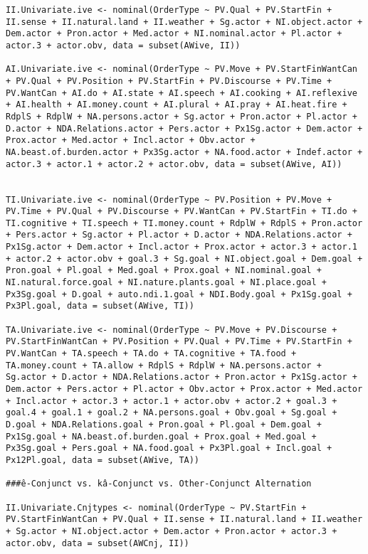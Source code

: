 \begin{lstlisting}[style=mystyle]
II.Univariate.ive <- nominal(OrderType ~ PV.Qual + PV.StartFin + II.sense + II.natural.land + II.weather + Sg.actor + NI.object.actor + Dem.actor + Pron.actor + Med.actor + NI.nominal.actor + Pl.actor + actor.3 + actor.obv, data = subset(AWive, II))

AI.Univariate.ive <- nominal(OrderType ~ PV.Move + PV.StartFinWantCan + PV.Qual + PV.Position + PV.StartFin + PV.Discourse + PV.Time + PV.WantCan + AI.do + AI.state + AI.speech + AI.cooking + AI.reflexive + AI.health + AI.money.count + AI.plural + AI.pray + AI.heat.fire + RdplS + RdplW + NA.persons.actor + Sg.actor + Pron.actor + Pl.actor + D.actor + NDA.Relations.actor + Pers.actor + Px1Sg.actor + Dem.actor + Prox.actor + Med.actor + Incl.actor + Obv.actor + NA.beast.of.burden.actor + Px3Sg.actor + NA.food.actor + Indef.actor + actor.3 + actor.1 + actor.2 + actor.obv, data = subset(AWive, AI))


TI.Univariate.ive <- nominal(OrderType ~ PV.Position + PV.Move + PV.Time + PV.Qual + PV.Discourse + PV.WantCan + PV.StartFin + TI.do + TI.cognitive + TI.speech + TI.money.count + RdplW + RdplS + Pron.actor + Pers.actor + Sg.actor + Pl.actor + D.actor + NDA.Relations.actor + Px1Sg.actor + Dem.actor + Incl.actor + Prox.actor + actor.3 + actor.1 + actor.2 + actor.obv + goal.3 + Sg.goal + NI.object.goal + Dem.goal + Pron.goal + Pl.goal + Med.goal + Prox.goal + NI.nominal.goal + NI.natural.force.goal + NI.nature.plants.goal + NI.place.goal + Px3Sg.goal + D.goal + auto.ndi.1.goal + NDI.Body.goal + Px1Sg.goal + Px3Pl.goal, data = subset(AWive, TI))

TA.Univariate.ive <- nominal(OrderType ~ PV.Move + PV.Discourse + PV.StartFinWantCan + PV.Position + PV.Qual + PV.Time + PV.StartFin + PV.WantCan + TA.speech + TA.do + TA.cognitive + TA.food + TA.money.count + TA.allow + RdplS + RdplW + NA.persons.actor + Sg.actor + D.actor + NDA.Relations.actor + Pron.actor + Px1Sg.actor + Dem.actor + Pers.actor + Pl.actor + Obv.actor + Prox.actor + Med.actor + Incl.actor + actor.3 + actor.1 + actor.obv + actor.2 + goal.3 + goal.4 + goal.1 + goal.2 + NA.persons.goal + Obv.goal + Sg.goal + D.goal + NDA.Relations.goal + Pron.goal + Pl.goal + Dem.goal + Px1Sg.goal + NA.beast.of.burden.goal + Prox.goal + Med.goal + Px3Sg.goal + Pers.goal + NA.food.goal + Px3Pl.goal + Incl.goal + Px12Pl.goal, data = subset(AWive, TA))

###ê-Conjunct vs. kâ-Conjunct vs. Other-Conjunct Alternation

II.Univariate.Cnjtypes <- nominal(OrderType ~ PV.StartFin + PV.StartFinWantCan + PV.Qual + II.sense + II.natural.land + II.weather + Sg.actor + NI.object.actor + Dem.actor + Pron.actor + actor.3 + actor.obv, data = subset(AWCnj, II))



\end{lstlisting}
